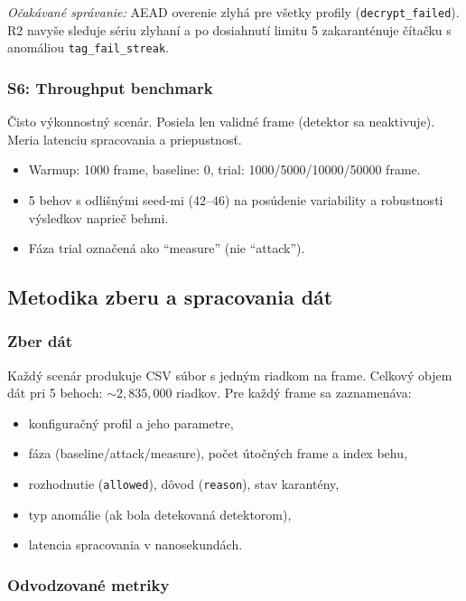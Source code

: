 \textit{Očakávané správanie:} AEAD overenie zlyhá pre všetky profily (\texttt{decrypt\_failed}). R2 navyše sleduje sériu zlyhaní a po dosiahnutí limitu 5 zakaranténuje čítačku s anomáliou \texttt{tag\_fail\_streak}.

\subsubsection{S6: Throughput benchmark}

Čisto výkonnostný scenár. Posiela len validné frame (detektor sa neaktivuje). Meria latenciu spracovania a priepustnosť.

\begin{itemize}[leftmargin=*,itemsep=2pt]
  \item Warmup: 1000 frame, baseline: 0, trial: 1000/5000/10000/50000 frame.
  \item 5 behov s odlišnými seed-mi (42--46) na posúdenie variability a robustnosti výsledkov naprieč behmi.
  \item Fáza trial označená ako ``measure'' (nie ``attack'').
\end{itemize}

\subsection{Metodika zberu a spracovania dát}
\label{sec:methodology}

\subsubsection{Zber dát}

Každý scenár produkuje CSV súbor s jedným riadkom na frame. Celkový objem dát pri 5 behoch: ${\sim}2{,}835{,}000$ riadkov. Pre každý frame sa zaznamenáva:

\begin{itemize}[leftmargin=*,itemsep=2pt]
  \item konfiguračný profil a jeho parametre,
  \item fáza (baseline/attack/measure), počet útočných frame a index behu,
  \item rozhodnutie (\texttt{allowed}), dôvod (\texttt{reason}), stav karantény,
  \item typ anomálie (ak bola detekovaná detektorom),
  \item latencia spracovania v nanosekundách.
\end{itemize}

\subsubsection{Odvodzované metriky}

